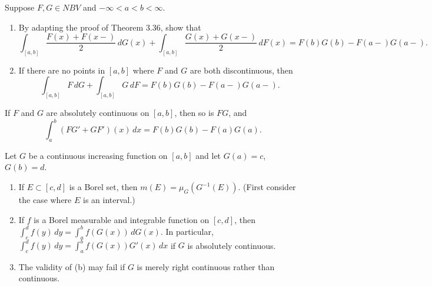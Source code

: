 	\begin{exercise}[Folland 3.34]
		Suppose $F, G \in NBV$ and $-\infty < a < b < \infty$.
		\begin{enumerate}[label=\textbf{\alph*.}]
			\item By adapting the proof of Theorem 3.36, show that
			\begin{equation}
				\int_{[a, b]} \frac{F(x) + F(x-)}{2} \, dG(x) + \int_{[a, b]} \frac{G(x) + G(x-)}{2} \, dF(x) = F(b)G(b) - F(a-)G(a-).
			\end{equation}
			\item If there are no points in $[a, b]$ where $F$ and $G$ are both discontinuous, then
			\begin{equation}
				\int_{[a, b]} F \, dG + \int_{[a, b]} G \, dF = F(b)G(b) - F(a-)G(a-).
			\end{equation}
		\end{enumerate}
	\end{exercise}
	\begin{solution}

	\end{solution}

	\begin{exercise}[Folland 3.35]
		If $F$ and $G$ are absolutely continuous on $[a, b]$, then so is $FG$, and
		\begin{equation}
			\int_a^b (FG' + GF')(x) \, dx = F(b)G(b) - F(a)G(a).
		\end{equation}
	\end{exercise}
	\begin{solution}

	\end{solution}

	\begin{exercise}[Folland 3.36]
		Let $G$ be a continuous increasing function on $[a, b]$ and let $G(a) = c$, $G(b) = d$.
		\begin{enumerate}[label=\textbf{\alph*.}]
			\item If $E \subset [c, d]$ is a Borel set, then $m(E) = \mu_G(G^{-1}(E))$. (First consider the case where $E$ is an interval.)
			\item If $f$ is a Borel measurable and integrable function on $[c, d]$, then $\int_c^d f(y) \, dy = \int_a^b f(G(x)) \, dG(x)$. In particular, $\int_c^d f(y) \, dy = \int_a^b f(G(x))G'(x) \, dx$ if $G$ is absolutely continuous.
			\item The validity of (b) may fail if $G$ is merely right continuous rather than continuous.
		\end{enumerate}
	\end{exercise}
	\begin{solution}

	\end{solution}

